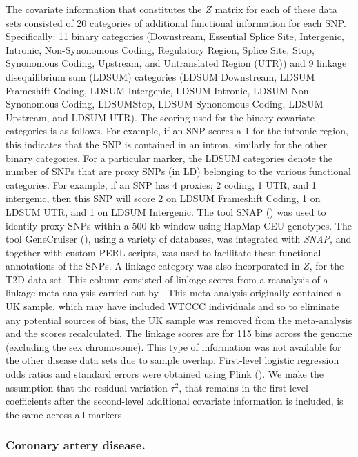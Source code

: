The covariate information that constitutes the $Z$ matrix
for each of these data sets consisted of 20 categories
of additional functional information for each SNP.
Specifically: 11 binary categories (Downstream, Essential
Splice Site, Intergenic, Intronic, Non-Synonomous Coding,
Regulatory Region, Splice Site, Stop, Synonomous Coding,
Upstream, and Untranslated Region (UTR)) and 9 linkage
disequilibrium sum (LDSUM) categories (LDSUM Downstream,
LDSUM Frameshift Coding, LDSUM Intergenic, LDSUM Intronic,
LDSUM Non-Synonomous Coding, LDSUMStop, LDSUM Synonomous
Coding, LDSUM Upstream, and LDSUM UTR). The scoring used
for the binary covariate categories is as follows. For
example, if an SNP scores a 1 for the intronic region,
this indicates that the SNP is contained in an intron,
similarly for the other binary categories. For a particular
marker, the LDSUM categories denote the number of SNPs
that are proxy SNPs (in LD) belonging to the various
functional categories. For example, if an SNP has 4 proxies;
2 coding, 1 UTR, and 1 intergenic, then this SNP will
score 2 on LDSUM Frameshift Coding, 1 on LDSUM UTR, and
1 on LDSUM Intergenic. The tool SNAP
(\citealp{Fimmers_Seuchter:1989})
was used to identify proxy SNPs within a 500 kb window
using HapMap CEU genotypes. The tool GeneCruiser
(\citealp{Barlow:1972}),
using a variety of databases, was integrated with
\textit{SNAP}, and together with custom PERL scripts, was
used to facilitate these functional annotations of the
SNPs. A linkage category was also incorporated in $Z$,
for the T2D data set. This column consisted of linkage
scores from a reanalysis of a linkage meta-analysis
carried out by
\citet{Castelloe_Zimmerman:2002}.
This meta-analysis originally contained a UK sample,
which may have included WTCCC individuals and so to
eliminate any potential sources of bias, the UK sample
was removed from the meta-analysis and the scores
recalculated. The linkage scores are for 115 bins across
the genome (excluding the sex chromosome). This type of
information was not available for the other disease data
sets due to sample overlap. First-level logistic regression
odds ratios and standard errors were obtained using Plink
(\citealp{Schwender:2007}).
We make the assumption that the residual variation $\tau^2$,
that remains in the first-level coefficients after the
second-level additional covariate information is included,
is the same across all markers.


\subsubsection{Coronary artery disease.}

